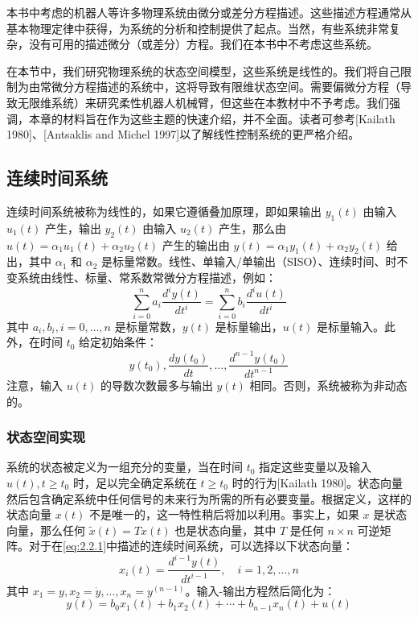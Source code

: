 \documentclass[UTF8,12pt,a4paper]{ctexart}
\theoremstyle{definition}
\begin{document}
本书中考虑的机器人等许多物理系统由微分或差分方程描述。这些描述方程通常从基本物理定律中获得，为系统的分析和控制提供了起点。当然，有些系统非常复杂，没有可用的描述微分（或差分）方程。我们在本书中不考虑这些系统。

在本节中，我们研究物理系统的状态空间模型，这些系统是线性的。我们将自己限制为由常微分方程描述的系统中，这将导致有限维状态空间。需要偏微分方程（导致无限维系统）来研究柔性机器人机械臂，但这些在本教材中不予考虑。我们强调，本章的材料旨在作为这些主题的快速介绍，并不全面。读者可参考[Kailath 1980]、[Antsaklis and Michel 1997]以了解线性控制系统的更严格介绍。

\subsection{连续时间系统}

连续时间系统被称为线性的，如果它遵循叠加原理，即如果输出 $y_1(t)$ 由输入 $u_1(t)$ 产生，输出 $y_2(t)$ 由输入 $u_2(t)$ 产生，那么由 $u(t)=\alpha_1 u_1(t)+\alpha_2 u_2(t)$ 产生的输出由 $y(t)=\alpha_1 y_1(t)+\alpha_2 y_2(t)$ 给出，其中 $\alpha_1$ 和 $\alpha_2$ 是标量常数。线性、单输入/单输出（SISO）、连续时间、时不变系统由线性、标量、常系数常微分方程描述，例如：
\begin{equation}\label{eq:2.2.1}
\sum_{i=0}^{n} a_i \frac{d^i y(t)}{dt^i} = \sum_{i=0}^{n} b_i \frac{d^i u(t)}{dt^i}
\end{equation}
其中 $a_i, b_i, i=0,\ldots,n$ 是标量常数，$y(t)$ 是标量输出，$u(t)$ 是标量输入。此外，在时间 $t_0$ 给定初始条件：
\begin{equation}
y(t_0), \frac{dy(t_0)}{dt}, \ldots, \frac{d^{n-1}y(t_0)}{dt^{n-1}}
\end{equation}
注意，输入 $u(t)$ 的导数次数最多与输出 $y(t)$ 相同。否则，系统被称为非动态的。

\subsubsection{状态空间实现}

系统的状态被定义为一组充分的变量，当在时间 $t_0$ 指定这些变量以及输入 $u(t), t \geq t_0$ 时，足以完全确定系统在 $t \geq t_0$ 时的行为[Kailath 1980]。状态向量然后包含确定系统中任何信号的未来行为所需的所有必要变量。根据定义，这样的状态向量 $x(t)$ 不是唯一的，这一特性稍后将加以利用。事实上，如果 $x$ 是状态向量，那么任何 $\tilde{x}(t)=Tx(t)$ 也是状态向量，其中 $T$ 是任何 $n \times n$ 可逆矩阵。对于在\eqref{eq:2.2.1}中描述的连续时间系统，可以选择以下状态向量：
\begin{equation}\label{eq:2.2.2}
x_i(t) = \frac{d^{i-1}y(t)}{dt^{i-1}}, \quad i=1,2,\ldots,n
\end{equation}
其中 $x_1=y, x_2=\dot{y}, \ldots, x_n=y^{(n-1)}$。输入-输出方程然后简化为：
\begin{equation}\label{eq:2.2.3}
y(t) = b_0 x_1(t) + b_1 x_2(t) + \cdots + b_{n-1} x_n(t) + u(t)
\end{equation}
\end{document}
